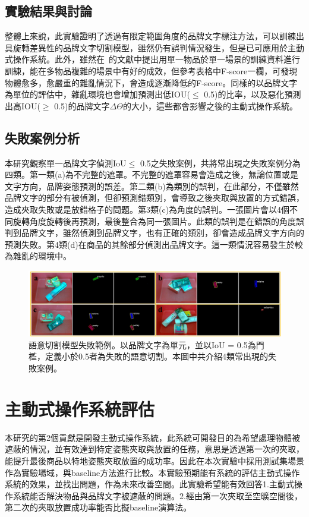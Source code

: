 \subsection{實驗結果與討論}
整體上來說，此實驗證明了透過有限定範圍角度的品牌文字標注方法，可以訓練出具旋轉差異性的品牌文字切割模型，雖然仍有誤判情況發生，但是已可應用於主動式操作系統。此外，雖然在~\cite{zeng2016multi}的文獻中提出用單一物品於單一場景的訓練資料進行訓練，能在多物品複雜的場景中有好的成效，但參考表格中F-score一欄，可發現物體愈多，愈嚴重的雜亂情況下，會造成逐漸降低的F-score。同樣的以品牌文字為單位的評估中，雜亂環境也會增加預測出低IOU($ \le$ 0.5)的比率，以及惡化預測出高IOU($ \ge$  0.5)的品牌文字$\Delta\Theta$的大小，這些都會影響之後的主動式操作系統。

\subsection{失敗案例分析}
本研究觀察單一品牌文字偵測IoU$ \le$ 0.5之失敗案例，共將常出現之失敗案例分為四類。第一類(a)為不完整的遮罩。不完整的遮罩容易會造成之後，無論位置或是文字方向，品牌姿態預測的誤差。第二類(b)為類別的誤判，在此部分，不僅雖然品牌文字的部分有被偵測，但卻預測錯類別，會導致之後夾取與放置的方式錯誤，造成夾取失敗或是放錯格子的問題。第3類(c)為角度的誤判。一張圖片會以4個不同旋轉角度旋轉後再預測，最後整合為同一張圖片。此類的誤判是在錯誤的角度誤判到品牌文字，雖然偵測到品牌文字，也有正確的類別，卻會造成品牌文字方向的預測失敗。第4類(d)在商品的其餘部分偵測出品牌文字。這一類情況容易發生於較為雜亂的環境中。





\begin{figure}[ht]
	\centering
	\includegraphics[height=!, width=1.0\linewidth, keepaspectratio=true]
	{./figures/failure_case.jpg}
  \caption{語意切割模型失敗範例。以品牌文字為單元，並以IoU = 0.5為門檻，定義小於0.5者為失敗的語意切割。本圖中共介紹4類常出現的失敗案例。}
  \label{figure:failure_case}
\end{figure}

\section{主動式操作系統評估}
本研究的第2個貢獻是開發主動式操作系統，此系統可開發目的為希望處理物體被遮蔽的情況，並有效達到特定姿態夾取與放置的任務，意思是透過第一次的夾取，能提升最後商品以特地姿態夾取放置的成功率。因此在本次實驗中採用測試集場景作為實驗場域，與baseline方法進行比較。本實驗預期能有系統的評估主動式操作系統的效果，並找出問題，作為未來改善空間。此實驗希望能有效回答1.主動式操作系統能否解決物品與品牌文字被遮蔽的問題。2.經由第一次夾取至空曠空間後，第二次的夾取放置成功率能否比擬baseline演算法。


